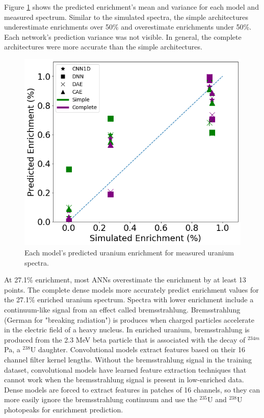 Figure \ref{fig:measured_uranium} shows the predicted enrichment's mean and variance for each model and measured spectrum. Similar to the simulated spectra, the simple architectures underestimate enrichments over 50\% and overestimate enrichments under 50\%. Each network's prediction variance was not visible. In general, the complete architectures were more accurate than the simple architectures. 

\begin{figure}[H]
	\centering
	\includegraphics[width=0.8\linewidth]{images/measured_uranium.png}
	\caption{Each model's predicted uranium enrichment for measured uranium spectra.}
	\label{fig:measured_uranium}
\end{figure}

At 27.1\% enrichment, most ANNs overestimate the enrichment by at least 13 points. The complete dense models more accurately predict enrichment values for the 27.1\% enriched uranium spectrum. Spectra with lower enrichment include a continuum-like signal from an effect called bremsstrahlung. Bremsstrahlung (German for "breaking radiation") is produces when charged particles accelerate in the electric field of a heavy nucleus. In enriched uranium, bremsstrahlung is produced from the 2.3 MeV beta particle that is associated with the decay of $^{234m}$Pa, a $^{238}$U daughter. Convolutional models extract features based on their 16 channel filter kernel lengths. Without the bremsstrahlung signal in the training dataset, convolutional models have learned feature extraction techniques that cannot work when the bremsstrahlung signal is present in low-enriched data. Dense models are forced to extract features in patches of 16 channels, so they can more easily ignore the bremsstrahlung continuum and use the $^{235}$U and $^{238}$U photopeaks for enrichment prediction. 


